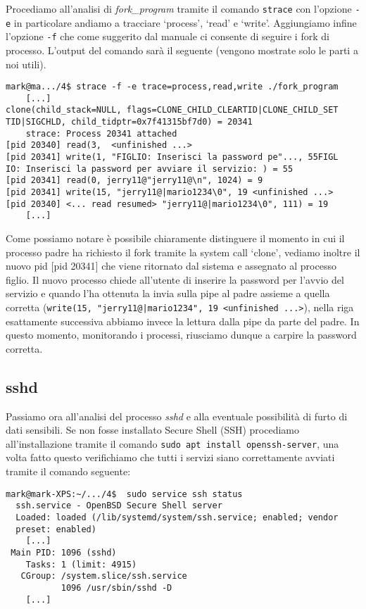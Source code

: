 \documentclass{article}
\newcommand{\filename}[1]{\textit{#1}}
\newcommand{\function}[1]{\textit{#1}}
\newcommand{\command}[1]{\texttt{#1}}
\begin{document}
Procediamo all'analisi di \filename{fork\_program} tramite il comando \command{strace} con l'opzione \command{-e} in particolare andiamo a tracciare `process', `read' e `write'. Aggiungiamo infine l'opzione \command{-f} che come suggerito dal manuale ci consente di seguire i fork di processo. L'output del comando sarà il seguente (vengono mostrate solo le parti a noi utili).

\begin{verbatim}
mark@ma.../4$ strace -f -e trace=process,read,write ./fork_program
    [...]
clone(child_stack=NULL, flags=CLONE_CHILD_CLEARTID|CLONE_CHILD_SET
TID|SIGCHLD, child_tidptr=0x7f41315bf7d0) = 20341
    strace: Process 20341 attached
[pid 20340] read(3,  <unfinished ...>
[pid 20341] write(1, "FIGLIO: Inserisci la password pe"..., 55FIGL
IO: Inserisci la password per avviare il servizio: ) = 55
[pid 20341] read(0, jerry11@"jerry11@\n", 1024) = 9
[pid 20341] write(15, "jerry11@|mario1234\0", 19 <unfinished ...>
[pid 20340] <... read resumed> "jerry11@|mario1234\0", 111) = 19
    [...]
\end{verbatim}

Come possiamo notare è possibile chiaramente distinguere il momento in cui il processo padre ha richiesto il fork tramite la system call `clone', vediamo inoltre il nuovo pid [pid 20341] che viene ritornato dal sistema e assegnato al processo figlio. Il nuovo processo chiede all'utente di inserire la password per l'avvio del servizio e quando l'ha ottenuta la invia sulla pipe al padre assieme a quella corretta (\command{write(15, "jerry11@|mario1234", 19 <unfinished ...>}), nella riga esattamente successiva abbiamo invece la lettura dalla pipe da parte del padre. In questo momento, monitorando i processi, riusciamo dunque a carpire la password corretta.

\subsection{sshd}

Passiamo ora all'analisi del processo \function{sshd} e alla eventuale possibilità di furto di dati sensibili. Se non fosse installato Secure Shell (SSH) procediamo all'installazione tramite il comando \command{sudo apt install openssh-server}, una volta fatto questo verifichiamo che tutti i servizi siano correttamente avviati tramite il comando seguente:

\begin{verbatim} 
mark@mark-XPS:~/.../4$  sudo service ssh status
  ssh.service - OpenBSD Secure Shell server
  Loaded: loaded (/lib/systemd/system/ssh.service; enabled; vendor
  preset: enabled)
    [...]
 Main PID: 1096 (sshd)
    Tasks: 1 (limit: 4915)
   CGroup: /system.slice/ssh.service
           1096 /usr/sbin/sshd -D
    [...]
\end{verbatim}
\end{document}
